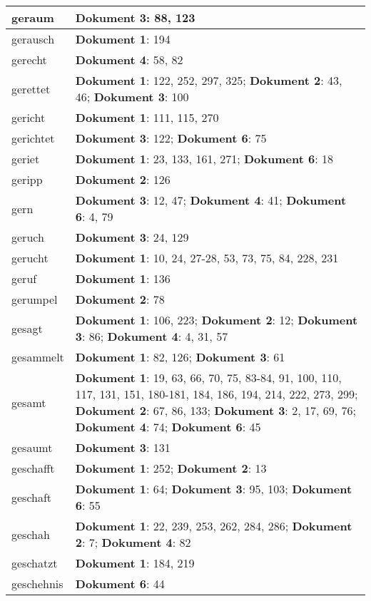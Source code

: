 \documentclass[a5paper]{article}
\begin{document}
\begin{longtable}[l]{|l|p{3in}|}
\hline
geraum & \textbf{Dokument 3}: 88, 123 \\
\hline
gerausch & \textbf{Dokument 1}: 194 \\
\hline
gerecht & \textbf{Dokument 4}: 58, 82 \\
\hline
gerettet & \textbf{Dokument 1}: 122, 252, 297, 325; \textbf{Dokument 2}: 43, 46; \textbf{Dokument 3}: 100 \\
\hline
gericht & \textbf{Dokument 1}: 111, 115, 270 \\
\hline
gerichtet & \textbf{Dokument 3}: 122; \textbf{Dokument 6}: 75 \\
\hline
geriet & \textbf{Dokument 1}: 23, 133, 161, 271; \textbf{Dokument 6}: 18 \\
\hline
geripp & \textbf{Dokument 2}: 126 \\
\hline
gern & \textbf{Dokument 3}: 12, 47; \textbf{Dokument 4}: 41; \textbf{Dokument 6}: 4, 79 \\
\hline
geruch & \textbf{Dokument 3}: 24, 129 \\
\hline
gerucht & \textbf{Dokument 1}: 10, 24, 27-28, 53, 73, 75, 84, 228, 231 \\
\hline
geruf & \textbf{Dokument 1}: 136 \\
\hline
gerumpel & \textbf{Dokument 2}: 78 \\
\hline
gesagt & \textbf{Dokument 1}: 106, 223; \textbf{Dokument 2}: 12; \textbf{Dokument 3}: 86; \textbf{Dokument 4}: 4, 31, 57 \\
\hline
gesammelt & \textbf{Dokument 1}: 82, 126; \textbf{Dokument 3}: 61 \\
\hline
gesamt & \textbf{Dokument 1}: 19, 63, 66, 70, 75, 83-84, 91, 100, 110, 117, 131, 151, 180-181, 184, 186, 194, 214, 222, 273, 299; \textbf{Dokument 2}: 67, 86, 133; \textbf{Dokument 3}: 2, 17, 69, 76; \textbf{Dokument 4}: 74; \textbf{Dokument 6}: 45 \\
\hline
gesaumt & \textbf{Dokument 3}: 131 \\
\hline
geschafft & \textbf{Dokument 1}: 252; \textbf{Dokument 2}: 13 \\
\hline
geschaft & \textbf{Dokument 1}: 64; \textbf{Dokument 3}: 95, 103; \textbf{Dokument 6}: 55 \\
\hline
geschah & \textbf{Dokument 1}: 22, 239, 253, 262, 284, 286; \textbf{Dokument 2}: 7; \textbf{Dokument 4}: 82 \\
\hline
geschatzt & \textbf{Dokument 1}: 184, 219 \\
\hline
geschehnis & \textbf{Dokument 6}: 44 \\

\end{longtable}
\end{document}
